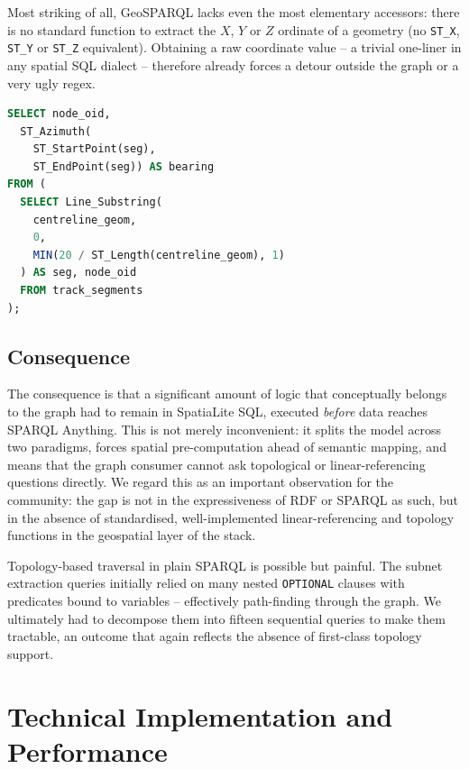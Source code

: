 \documentclass{ceurart}
\begin{document}
Most striking of all, GeoSPARQL lacks even the most elementary accessors: there
is no standard function to extract the $X$, $Y$ or $Z$ ordinate of a geometry (no
\texttt{ST\_X}, \texttt{ST\_Y} or \texttt{ST\_Z} equivalent). Obtaining a raw
coordinate value -- a trivial one-liner in any spatial SQL dialect -- therefore
already forces a detour outside the graph or a very ugly regex.

\begin{lstlisting}[language=SQL,caption={Switch branch determination in
  SpatiaLite: the direction of a branch is derived from the azimuth of a short
  substring of each track segment near the switch node -- an operation with no
  GeoSPARQL equivalent.},label={lst:switch}]
SELECT node_oid,
  ST_Azimuth(
    ST_StartPoint(seg),
    ST_EndPoint(seg)) AS bearing
FROM (
  SELECT Line_Substring(
    centreline_geom,
    0,
    MIN(20 / ST_Length(centreline_geom), 1)
  ) AS seg, node_oid
  FROM track_segments
);
\end{lstlisting}

\subsection{Consequence}

The consequence is that a significant amount of logic that conceptually belongs
to the graph had to remain in SpatiaLite SQL, executed \emph{before} data reaches
SPARQL Anything. This is not merely inconvenient: it splits the model across two
paradigms, forces spatial pre-computation ahead of semantic mapping, and means
that the graph consumer cannot ask topological or linear-referencing questions
directly. We regard this as an important observation for the community: the gap
is not in the expressiveness of RDF or SPARQL as such, but in the absence of
standardised, well-implemented linear-referencing and topology functions in the
geospatial layer of the stack.

Topology-based traversal in plain SPARQL is possible but painful. The subnet
extraction queries initially relied on many nested \texttt{OPTIONAL} clauses with
predicates bound to variables -- effectively path-finding through the graph. We
ultimately had to decompose them into fifteen sequential queries to make them
tractable, an outcome that again reflects the absence of first-class topology
support.

\section{Technical Implementation and Performance}
\label{sec:implementation}
\end{document}
